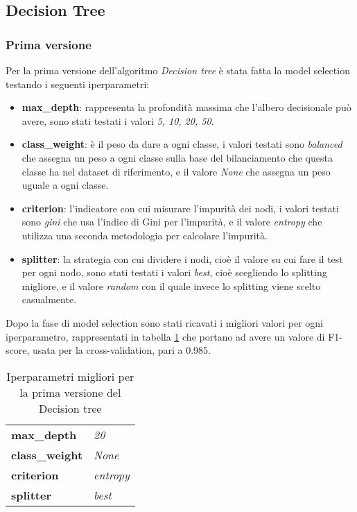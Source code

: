 \subsection{Decision Tree}
\subsubsection{Prima versione}\label{subsubsec:dtv1}
Per la prima versione dell'algoritmo \textit{Decision tree} è stata fatta la model selection testando i seguenti iperparametri:
\begin{itemize}
\item \textbf{max\_depth}: rappresenta la profondità massima che l'albero decisionale può avere, sono stati testati i valori \textit{5, 10, 20, 50}.
\item \textbf{class\_weight}: è il peso da dare a ogni classe, i valori testati sono \textit{balanced} che assegna un peso a ogni classe sulla base del bilanciamento che questa classe ha nel dataset di riferimento, e il valore \textit{None} che assegna un peso uguale a ogni classe.
\item \textbf{criterion}: l'indicatore con cui misurare l'impurità dei nodi, i valori testati sono \textit{gini} che usa l'indice di Gini per l'impurità, e il valore \textit{entropy} che utilizza una seconda metodologia per calcolare l'impurità.
\item \textbf{splitter}: la strategia con cui dividere i nodi, cioè il valore su cui fare il test per ogni nodo, sono stati testati i valori \textit{best}, cioè scegliendo lo splitting migliore, e il valore \textit{random} con il quale invece lo splitting viene scelto casualmente.
\end{itemize}

Dopo la fase di model selection sono stati ricavati i migliori valori per ogni iperparametro, rappresentati in tabella \ref{tab:dtv1} che portano ad avere un valore di F1-score, usata per la cross-validation, pari a 0.985.

\begin{table}[h] 
\centering
\begin{tabular}{l l}
\hline
\textbf{max\_depth} & \textit{20}\\
\textbf{class\_weight} & \textit{None}\\
\textbf{criterion} & \textit{entropy}\\
\textbf{splitter} & \textit{best}\\
\hline
\end{tabular}
\caption{Iperparametri migliori per la prima versione del Decision tree}
\label{tab:dtv1}
\end{table}


